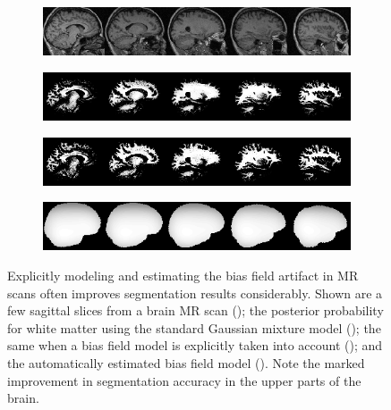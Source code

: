 \documentclass[10pt,twoside]{book}
\begin{document}
\begin{figure}
  \centering
  \begin{subfigure}{0.95\textwidth}
    \centering
    \includegraphics[width=\textwidth]{tmi1Fig4_stripped_Part-0}
    \caption{}
    \label{fig:biasFieldEstimation_part0}
  \end{subfigure}
  \begin{subfigure}{0.95\textwidth}
    \centering
    \includegraphics[width=\textwidth]{tmi1Fig4_stripped_Part-1}
    \caption{}
    \label{fig:biasFieldEstimation_part1}
  \end{subfigure}
  \begin{subfigure}{0.95\textwidth}
    \centering
    \includegraphics[width=\textwidth]{tmi1Fig4_stripped_Part-2}
    \caption{}
    \label{fig:biasFieldEstimation_part2}
  \end{subfigure}
  \begin{subfigure}{0.95\textwidth}
    \centering
    \includegraphics[width=\textwidth]{tmi1Fig4_stripped_Part-3}
    \caption{}
    \label{fig:biasFieldEstimation_part3}
  \end{subfigure}
  \caption{Explicitly modeling and estimating the bias field artifact in MR scans often improves segmentation results considerably. Shown are a few sagittal slices from a brain MR scan (); the posterior probability for white matter using the standard Gaussian mixture model (); the same when a bias field model is explicitly taken into account (); and the automatically estimated bias field model (). Note the marked improvement in segmentation accuracy in the upper parts of the brain.}
  \label{fig:biasFieldEstimation}
\end{figure}
\end{document}
